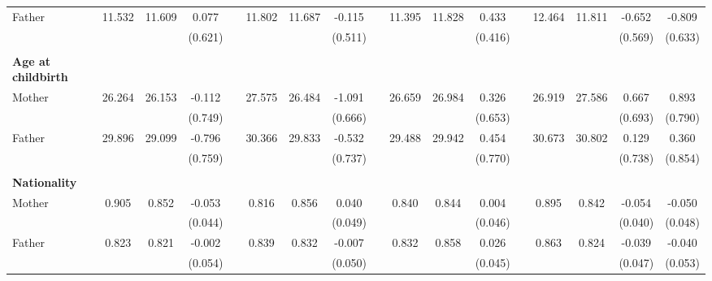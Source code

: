 \begin{landscape}
\begin{table}[p]
\begin{adjustwidth}{-2.5cm}{}
{\begin{tabular}{l*{16}{c}}
Father & 11.532 & 11.609 & 0.077 &  & 11.802 & 11.687 & -0.115 &  & 11.395 & 11.828 & 0.433 &  & 12.464 & 11.811 & -0.652 & -0.809 \\ 
 &  &  & (0.621) &  &  &  & (0.511) &  &  &  & (0.416) &  &  &  & (0.569) & (0.633) \\ 






 \\
\textbf{Age at childbirth }\\
\hline
Mother & 26.264 & 26.153 & -0.112 &  & 27.575 & 26.484 & -1.091 &  & 26.659 & 26.984 & 0.326 &  & 26.919 & 27.586 & 0.667 & 0.893 \\ 
 &  &  & (0.749) &  &  &  & (0.666) &  &  &  & (0.653) &  &  &  & (0.693) & (0.790) \\ 
Father & 29.896 & 29.099 & -0.796 &  & 30.366 & 29.833 & -0.532 &  & 29.488 & 29.942 & 0.454 &  & 30.673 & 30.802 & 0.129 & 0.360 \\ 
 &  &  & (0.759) &  &  &  & (0.737) &  &  &  & (0.770) &  &  &  & (0.738) & (0.854) \\ 


\\
\textbf{Nationality}\\
\hline 
Mother & 0.905 & 0.852 & -0.053 &  & 0.816 & 0.856 & 0.040 &  & 0.840 & 0.844 & 0.004 &  & 0.895 & 0.842 & -0.054 & -0.050 \\ 
 &  &  & (0.044) &  &  &  & (0.049) &  &  &  & (0.046) &  &  &  & (0.040) & (0.048) \\ 
Father & 0.823 & 0.821 & -0.002 &  & 0.839 & 0.832 & -0.007 &  & 0.832 & 0.858 & 0.026 &  & 0.863 & 0.824 & -0.039 & -0.040 \\ 
  &  &  & (0.054) &  &  &  & (0.050) &  &  &  & (0.045) &  &  &  & (0.047) & (0.053) \\ 


\end{tabular}}
\end{adjustwidth}
\end{table}
\end{landscape}
